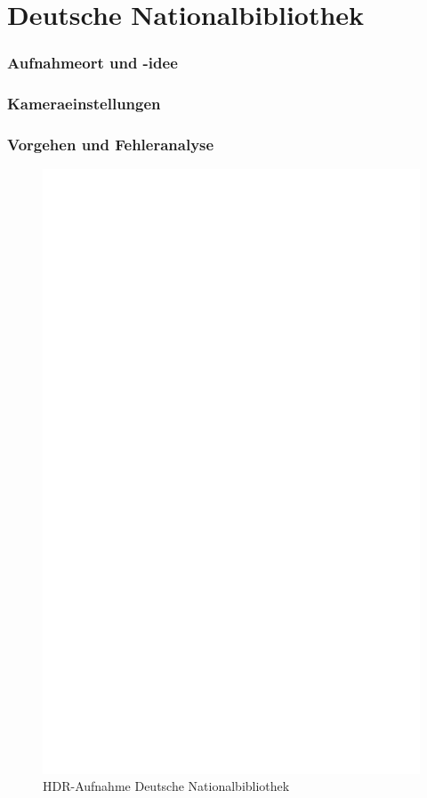 \documentclass[liststotoc,bibtotoc,fontsize=14pt,]{scrreprt}
\begin{document}
	\section{Deutsche Nationalbibliothek}
	\label{sec:bibo}
	\subsubsection{Aufnahmeort und -idee}
	

	
	\subsubsection{Kameraeinstellungen}

			
	\subsubsection{Vorgehen und Fehleranalyse}
	
	
			 \newpage
			 \begin{figure}[h]
			 	\includegraphics[width=\linewidth]{img/ph.jpg}
			 	\caption{HDR-Aufnahme Deutsche Nationalbibliothek}
			 \end{figure}
\end{document}
